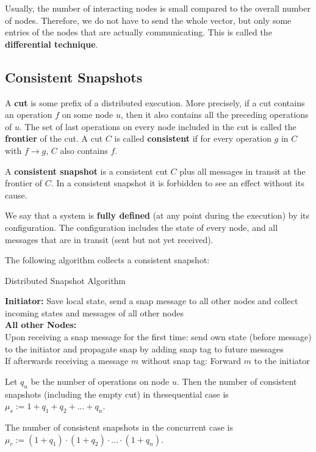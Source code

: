 Usually, the number of interacting nodes is small compared to the overall number of nodes. Therefore, we do not have to send the whole vector, but only some entries of the nodes that are actually communicating. This is called the \textbf{differential technique}.


\subsection{Consistent Snapshots}

A \textbf{cut} is some prefix of a distributed execution. More precisely, if a cut contains an operation $f$ on some node $u$, then it also contains all the preceding operations of $u$. The set of last operations on every node included in the cut is called the \textbf{frontier} of the cut. A cut $C$ is called \textbf{consistent} if for every operation $g$ in $C$ with $f \to g$, $C$ also contains $f$. \medskip

A \textbf{consistent snapshot} is a consistent cut $C$ plus all messages in transit at the frontier of $C$. In a consistent snapshot it is forbidden to see an effect without its cause. \medskip

We say that a system is \textbf{fully defined} (at any point during the execution) by its configuration. The configuration includes the state of every node, and all messages that are in transit (sent but not yet received). \medskip

The following algorithm collects a consistent snapshot: \medskip

\begin{algorithm}[H]
\caption{Distributed Snapshot Algorithm}
	\textbf{Initiator:} Save local state, send a snap message to all other nodes and collect incoming states and messages of all other nodes \\
	\BlankLine
	\textbf{All other Nodes:} \\
	Upon receiving a snap message for the first time: send own state (before message) to the initiator and propagate snap by adding snap tag to future messages \\
	If afterwards receiving a message $m$ without snap tag: Forward $m$ to the initiator
\end{algorithm}
\medskip

Let $q_u$ be the number of operations on node $u$. Then the number of consistent snapshots (including the empty cut) in thesequential case is $\mu_s := 1 + q_1 + q_2 + ... + q_n$. \medskip

The number of consistent snapshots in the concurrent case is $\mu_c :=(1+q_1) \cdot (1+q_2) \cdot ... \cdot (1+q_n)$. \medskip

